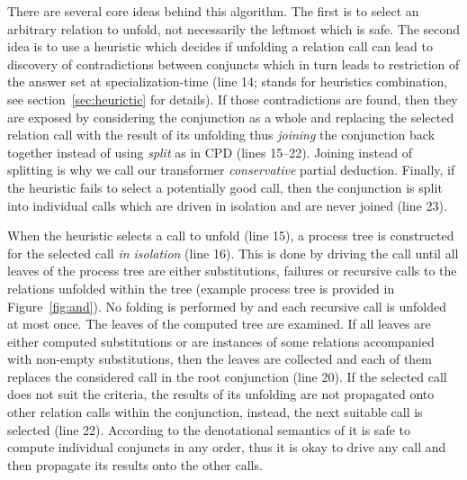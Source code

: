 There are several core ideas behind this algorithm.
The first is to select an arbitrary relation to unfold, not necessarily the leftmost which is safe.
The second idea is to use a heuristic which decides if unfolding a relation call can lead to discovery of contradictions between conjuncts which in turn leads to restriction of the answer set at specialization-time (line 14;  stands for heuristics combination, see section~\ref{sec:heurictic} for details).
If those contradictions are found, then they are exposed by considering the conjunction as a whole and replacing the selected relation call with the result of its unfolding thus \emph{joining} the conjunction back together instead of using \emph{split} as in CPD (lines 15--22).
Joining instead of splitting is why we call our transformer \emph{conservative} partial deduction.
Finally, if the heuristic fails to select a potentially good call, then the conjunction is split into individual calls which are driven in isolation and are never joined (line 23).

When the heuristic selects a call to unfold (line 15), a process tree is constructed for the selected call \emph{in isolation} (line 16).
This is done by driving the call until all leaves of the process tree are either substitutions, failures or recursive calls to the relations unfolded within the tree (example process tree is provided in Figure~\ref{fig:and}).
No folding is performed by  and each recursive call is unfolded at most once.
The leaves of the computed tree are examined.
If all leaves are either computed substitutions or are instances of some relations accompanied with non-empty substitutions, then the leaves are collected and each of them replaces the considered call in the root conjunction (line 20).
If the selected call does not suit the criteria, the results of its unfolding are not propagated onto other relation calls within the conjunction, instead, the next suitable call is selected (line 22).
According to the denotational semantics of \mk it is safe to compute individual conjuncts in any order, thus it is okay to drive any call and then propagate its results onto the other calls.


